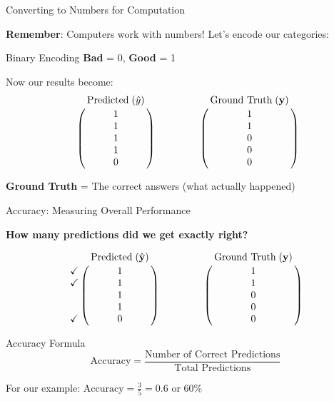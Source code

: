 \documentclass[usenames,dvipsnames]{beamer}
\begin{document}
\begin{frame}{Converting to Numbers for Computation}

\textbf{Remember}: Computers work with numbers! Let's encode our categories:

\begin{examplebox}{Binary Encoding}
\textbf{Bad} = 0, \textbf{Good} = 1
\end{examplebox}

\vspace{-5pt}
Now our results become:
$$\bordermatrix{&\text{Predicted}\;(\hat{y})\cr
                &1\cr
                &1\cr
                &1\cr
                &1\cr
                &0}
                \qquad \qquad
   \bordermatrix{&\text{Ground Truth}\;(\vy)\cr
                &1\cr
                &1\cr
                &0\cr
                &0\cr
                &0}
$$

\textbf{Ground Truth} = The correct answers (what actually happened)
\end{frame}

\begin{frame}{Accuracy: Measuring Overall Performance}

\textbf{How many predictions did we get exactly right?}

$$
\bordermatrix{&\text{Predicted}\;(\yhat)\cr
               \checkmark&1\cr
               \checkmark&1\cr
                &1\cr
                &1\cr
               \checkmark&0}
\qquad \qquad
\bordermatrix{&\text{Ground Truth}\;(\vy)\cr
                &1\cr
                &1\cr
                &0\cr
                &0\cr
                &0}
$$

\pause
\begin{definitionbox}{Accuracy Formula}
$$\text{Accuracy} = \frac{\text{Number of Correct Predictions}}{\text{Total Predictions}}$$
\end{definitionbox}

\pause For our example: $\text{Accuracy} = \frac{3}{5} = 0.6$ or $60\%$

\end{frame}
\end{document}
